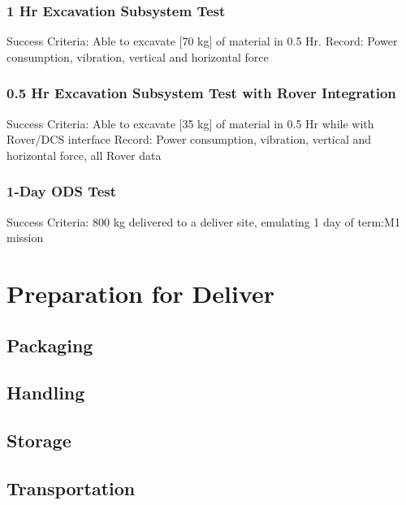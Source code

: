 \subsubsection{1 Hr Excavation Subsystem Test}
\label{ref:1 Hr Excavation Subsystem Test}
Success Criteria: Able to excavate [70 kg] of material in 0.5 Hr. 
Record: Power consumption, vibration, vertical and horizontal force
\subsubsection{0.5 Hr Excavation Subsystem Test with Rover Integration }
\label{ref:0.5 Hr Excavation Subsystem Test with Rover Integration }
Success Criteria: Able to excavate [35 kg] of material in 0.5 Hr while with Rover/DCS interface
Record: Power consumption, vibration, vertical and horizontal force, all Rover data
\subsubsection{1-Day ODS Test}
\label{ref:1-Day ODS Test}
Success Criteria: 800 kg delivered to a deliver site, emulating 1 day of {term:M1} mission
\newpage
\section{Preparation for Deliver}
\subsection{Packaging}
\subsubsection{}
\label{ref:}

\subsection{Handling}
\label{ref:}

\subsection{Storage}
\label{ref:}

\subsection{Transportation}
\label{ref:}

